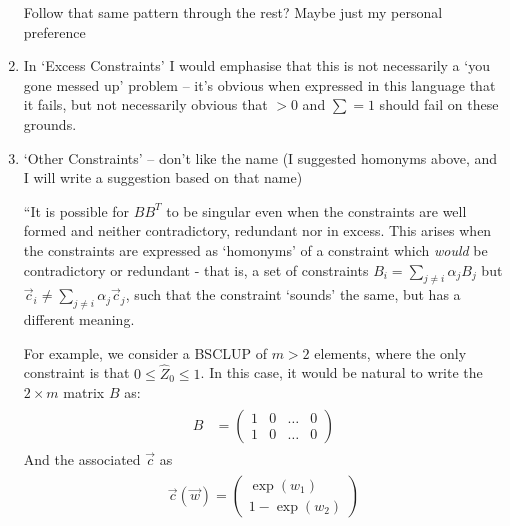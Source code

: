 \documentclass[]{article}
\begin{document}
\begin{enumerate}
			Follow that same pattern through the rest? Maybe just my personal preference

			\item In `Excess Constraints' I would emphasise that this is not necessarily a `you gone messed up' problem -- it's obvious when expressed in this language that it fails, but not necessarily obvious that $>0$ and $\sum = 1$ should fail on these grounds. 
			
			\item `Other Constraints' -- don't like the name (I suggested homonyms above, and I will write a suggestion based on that name)
			
			``It is possible for $BB^T$ to be singular even when the constraints are well formed and neither contradictory, redundant nor in excess. This arises when the constraints are expressed as `homonyms' of a constraint which \textit{would} be contradictory or redundant - that is, a set of constraints $B_i = \sum_{j\neq i} \alpha_j B_j$ but $\vec{c}_i \neq \sum_{j\neq i} \alpha_j \vec{c}_j$, such that the constraint `sounds' the same, but has a different meaning.
			
			For example, we consider a BSCLUP of $m > 2$ elements, where the only constraint is that $0 \leq \hat{Z}_0 \leq 1$. In this case, it would be natural to write the $2\times m$ matrix $B$ as:
			\begin{align}
				\begin{split}
					B &= \begin{pmatrix}
						1 & 0 & \hdots & 0
						\\
						1 & 0 & \hdots & 0
					\end{pmatrix}
				\end{split}
			\end{align}
			And the associated $\vec{c}$ as
			\begin{align}
				\begin{split}
					\vec{c}(\vec{w}) = \begin{pmatrix}
						\exp(w_1)
						\\
						1 - \exp(w_2)
					\end{pmatrix}
				\end{split}
			\end{align}
		

\end{enumerate}
\end{document}
